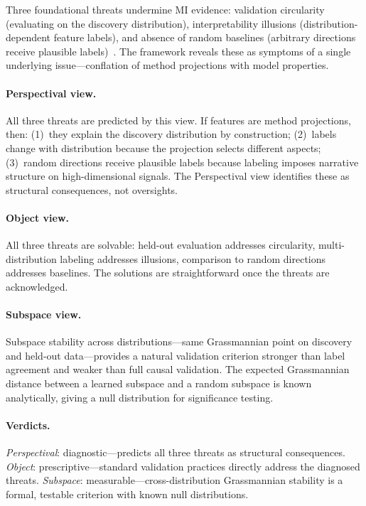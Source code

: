 \documentclass{article}
\begin{document}
Three foundational threats undermine MI evidence: validation circularity
(evaluating on the discovery distribution), interpretability illusions
(distribution-dependent feature labels), and absence of random baselines
(arbitrary directions receive plausible labels)~\citep{casper2023}. The
framework reveals these as symptoms of a single underlying
issue---conflation of method projections with model properties.

\paragraph{Perspectival view.}
All three threats are predicted by this view. If features are method
projections, then: (1)~they explain the discovery distribution by
construction; (2)~labels change with distribution because the projection
selects different aspects; (3)~random directions receive plausible labels
because labeling imposes narrative structure on high-dimensional signals.
The Perspectival view identifies these as structural consequences, not
oversights.

\paragraph{Object view.}
All three threats are solvable: held-out evaluation addresses circularity,
multi-distribution labeling addresses illusions, comparison to random
directions addresses baselines. The solutions are straightforward once
the threats are acknowledged.

\paragraph{Subspace view.}
Subspace stability across distributions---same Grassmannian point on
discovery and held-out data---provides a natural validation criterion
stronger than label agreement and weaker than full causal validation. The
expected Grassmannian distance between a learned subspace and a random
subspace is known analytically, giving a null distribution for
significance testing.

\paragraph{Verdicts.}
\emph{Perspectival}: diagnostic---predicts all three threats as
structural consequences.
\emph{Object}: prescriptive---standard validation practices directly
address the diagnosed threats.
\emph{Subspace}: measurable---cross-distribution Grassmannian stability
is a formal, testable criterion with known null distributions.
\end{document}
